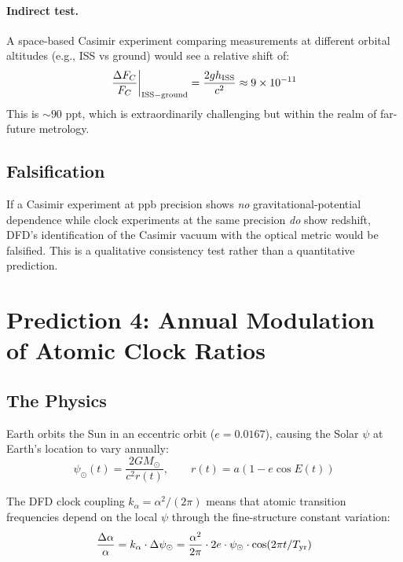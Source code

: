 \documentclass[11pt]{article}
\begin{document}
\paragraph{Indirect test.} A space-based Casimir experiment comparing measurements
at different orbital altitudes (e.g., ISS vs ground) would see a relative shift of:
\begin{equation}
\frac{\Delta F_C}{F_C}\bigg|_{\rm ISS-ground} = \frac{2g h_{\rm ISS}}{c^2} \approx 9 \times 10^{-11}
\end{equation}
This is $\sim 90$ ppt, which is extraordinarily challenging but within the realm of
far-future metrology.

\subsection{Falsification}

If a Casimir experiment at ppb precision shows \emph{no} gravitational-potential
dependence while clock experiments at the same precision \emph{do} show redshift,
DFD's identification of the Casimir vacuum with the optical metric would be falsified.
This is a qualitative consistency test rather than a quantitative prediction.

\section{Prediction 4: Annual Modulation of Atomic Clock Ratios}
\label{sec:annual}

\subsection{The Physics}

Earth orbits the Sun in an eccentric orbit ($e = 0.0167$), causing the Solar $\psi$
at Earth's location to vary annually:
\begin{equation}
\psi_\odot(t) = \frac{2GM_\odot}{c^2 r(t)}, \qquad r(t) = a(1 - e\cos E(t))
\end{equation}

The DFD clock coupling $k_\alpha = \alpha^2/(2\pi)$ means that atomic transition
frequencies depend on the local $\psi$ through the fine-structure constant variation:
\begin{equation}
\frac{\Delta\alpha}{\alpha} = k_\alpha \cdot \Delta\psi_\odot
= \frac{\alpha^2}{2\pi}\cdot 2e\cdot\psi_\odot\cdot\cos(2\pi t/T_{\rm yr})
\end{equation}
\end{document}
